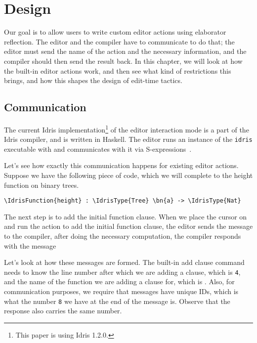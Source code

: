 \section{Design}\label{chap:design}

Our goal is to allow users to write custom editor actions using
elaborator reflection.
The editor and the compiler have to communicate to do that; the editor must
send the name of the action and the necessary information, and the
compiler should then send the result back.
In this chapter, we will look at how the built-in editor actions work, and then
see what kind of restrictions this brings, and how this shapes the design of
edit-time tactics.

\subsection{Communication}\label{sec:communication}

The current Idris implementation\footnote{This paper is using Idris 1.2.0.} of
the editor interaction mode is a part of the Idris compiler, and is written in
Haskell. The editor runs an instance of the \texttt{idris} executable with and
communicates with it via S-expressions~\cite{mccarthy}.

Let's see how exactly this communication happens for existing editor actions.
Suppose we have the following piece of code, which we will complete to the
height function on binary trees.

\begin{Verbatim}
\IdrisFunction{height} : \IdrisType{Tree} \bn{a} -> \IdrisType{Nat}
\end{Verbatim}

The next step is to add the initial function clause.
When we place the cursor on  and run the action to add the initial
function clause, the editor sends the message 
to the compiler, after doing the necessary
computation, the compiler responds with the message 

Let's look at how these messages are formed. The built-in add clause command
needs to know the line number after which we are adding a clause, which is
\texttt{4}, and the name of the function we are adding a clause for, which is
.
Also, for communication purposes, we require that messages have unique IDs,
which is what the number \texttt{8} we have at the end of the message is.
Observe that the response also carries the same number.

